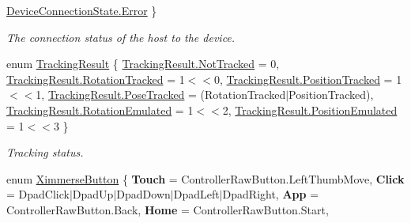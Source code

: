 \begin{DoxyCompactItemize}
\mbox{\hyperlink{namespace_ximmerse_1_1_input_system_ae83a958497a9f53a5b605720a5bddfb6a902b0d55fddef6f8d651fe1035b7d4bd}{Device\+Connection\+State.\+Error}}
 \}
\begin{DoxyCompactList}\small\item\em The connection status of the host to the device. \end{DoxyCompactList}\item 
enum \mbox{\hyperlink{namespace_ximmerse_1_1_input_system_ab4ab70561e1b40e9909cb70ef604465a}{Tracking\+Result}} \{ \newline
\mbox{\hyperlink{namespace_ximmerse_1_1_input_system_ab4ab70561e1b40e9909cb70ef604465aa90cec99cb3d475323540596ef1e2f5dc}{Tracking\+Result.\+Not\+Tracked}} = 0, 
\mbox{\hyperlink{namespace_ximmerse_1_1_input_system_ab4ab70561e1b40e9909cb70ef604465aa001701798b6d9e472b609ac20b35b87d}{Tracking\+Result.\+Rotation\+Tracked}} = 1$<$$<$0, 
\mbox{\hyperlink{namespace_ximmerse_1_1_input_system_ab4ab70561e1b40e9909cb70ef604465aab7ddf1ada4f53b9481038b4bf8c6cc56}{Tracking\+Result.\+Position\+Tracked}} = 1$<$$<$1, 
\mbox{\hyperlink{namespace_ximmerse_1_1_input_system_ab4ab70561e1b40e9909cb70ef604465aa03b7e73d85589978f9c3a063b8246508}{Tracking\+Result.\+Pose\+Tracked}} = (Rotation\+Tracked$\vert$\+Position\+Tracked), 
\newline
\mbox{\hyperlink{namespace_ximmerse_1_1_input_system_ab4ab70561e1b40e9909cb70ef604465aa9240f43bf48a99f91e6648d9cd016b8d}{Tracking\+Result.\+Rotation\+Emulated}} = 1$<$$<$2, 
\mbox{\hyperlink{namespace_ximmerse_1_1_input_system_ab4ab70561e1b40e9909cb70ef604465aaa3348ea1457ed15751227c800ae211a3}{Tracking\+Result.\+Position\+Emulated}} = 1$<$$<$3
 \}
\begin{DoxyCompactList}\small\item\em Tracking status. \end{DoxyCompactList}\item 
\mbox{\label{namespace_ximmerse_1_1_input_system_aeb030df68d97bf26e0c3006ba900c653}} 
enum \mbox{\hyperlink{namespace_ximmerse_1_1_input_system_aeb030df68d97bf26e0c3006ba900c653}{Ximmerse\+Button}} \{ \newline
{\bfseries Touch} = Controller\+Raw\+Button.\+Left\+Thumb\+Move, 
{\bfseries Click} = Dpad\+Click$\vert$\+Dpad\+Up$\vert$\+Dpad\+Down$\vert$\+Dpad\+Left$\vert$\+Dpad\+Right, 
{\bfseries App} = Controller\+Raw\+Button.\+Back, 
{\bfseries Home} = Controller\+Raw\+Button.\+Start, 
\newline

\end{DoxyCompactItemize}
